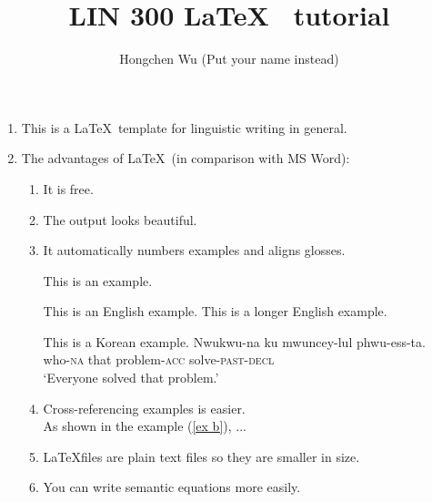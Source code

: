 \documentclass[12pt, letterpaper]{article}
\begin{document}
\title{LIN 300  \LaTeX~ tutorial}
\author{Hongchen Wu (Put your name instead)}
\maketitle

\begin{enumerate}
	\item This is a \LaTeX~template for linguistic writing in general.

	\item The advantages of \LaTeX~(in comparison with MS Word):
		\begin{enumerate}
			\item It is free.

			\item The output looks beautiful.
			
			\item It automatically numbers examples and aligns glosses.
			
				\begin{exe}
				\ex\label{example} This is an example.
				\ex\label{english example} \begin{xlist}
				        \ex\label{ex a} This is an English example.
				        \ex\label{ex b} This is a longer English example.
				    \end{xlist}
				
				\ex\label{korean example} This is a Korean example. \gll 
					Nwukwu-na ku mwuncey-lul phwu-ess-ta.\\
					who-\textsc{na} that problem-\textsc{acc} solve-\textsc{past}-\textsc{decl}\\
					\glt `Everyone solved that problem.'
				\end{exe}
						
			\item Cross-referencing examples is easier. \\

				As shown in the example (\ref{ex b}), ...\\

			\item \LaTeX files are plain text files so they are smaller in size.
			
			\item You can write semantic equations more easily.\\


\end{enumerate}
\end{enumerate}
\end{document}
